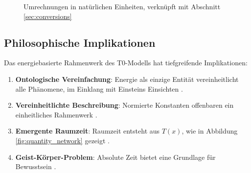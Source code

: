 \documentclass[12pt,a4paper]{article}
\newcommand{\Tfield}{T(x)}
\begin{document}
\begin{figure}[htbp]
\centering
{}
\caption{Umrechnungen in natürlichen Einheiten, verknüpft mit Abschnitt \ref{sec:conversions}}
\label{fig:practical_conversion}
\end{figure}

\subsection{Philosophische Implikationen}
\label{sec:philosophy}

Das energiebasierte Rahmenwerk des T0-Modells hat tiefgreifende Implikationen:
\begin{enumerate}
\item \textbf{Ontologische Vereinfachung}: Energie als einzige Entität vereinheitlicht alle Phänomene, im Einklang mit Einsteins Einsichten \cite{Einstein1905, pascher_dualismus_2025}.
\item \textbf{Vereinheitlichte Beschreibung}: Normierte Konstanten offenbaren ein einheitliches Rahmenwerk \cite{pascher_vereinheitlichung_2025}.
\item \textbf{Emergente Raumzeit}: Raumzeit entsteht aus \(\Tfield\), wie in Abbildung \ref{fig:quantity_network} gezeigt \cite{pascher_perspective_2025}.
\item \textbf{Geist-Körper-Problem}: Absolute Zeit bietet eine Grundlage für Bewusstsein \cite{pascher_perspective_2025}.
\end{enumerate}
\end{document}

